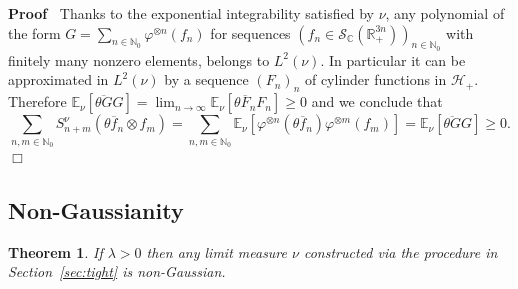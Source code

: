 \documentclass[a4paper,11pt]{article}
\newenvironment{proof}{\noindent\textbf{Proof\ }}{\hspace*{\fill}$\Box$\medskip}
\newtheorem{theorem}{Theorem}[section]
\numberwithin{equation}{section}
\begin{document}
\begin{proof}
  Thanks to the exponential integrability satisfied by $\nu$, any
  polynomial of the form $G = \sum_{n \in\mathbb{N}_{0}} \varphi^{\otimes n} (f_n)$
  for sequences $(f_n \in \mathcal{S}_{\mathbb{C}} (\mathbb{R}^{3 n}_{+}))_{n
  \in\mathbb{N}_{0}}$ with finitely many nonzero elements, belongs to $L^2 (\nu)$.
  In particular it can be approximated in $L^2 (\nu)$ by  a sequence
  $(F_n)_n$ of cylinder functions in $\mathcal{H}_+$. Therefore
  $\mathbb{E}_{\nu}  [\overline{\theta G} G] = \lim_{n \rightarrow \infty}
  \mathbb{E}_{\nu}  [\overline{\theta F_n} F_n] \geqslant 0$ and we conclude
  that
  \[ \sum_{n, m \in\mathbb{N}_{0}} S_{n + m}^{\nu} (\overline{\theta f_n} \otimes
     f_m) = \sum_{n, m \in\mathbb{N}_{0}} \mathbb{E}_{\nu} [\varphi^{\otimes n}
     (\overline{\theta f_n}) \varphi^{\otimes m} (f_m)] =\mathbb{E}_{\nu} 
     [\overline{\theta G} G] \geqslant 0. \]
\end{proof}



\subsection{Non-Gaussianity}
\label{ss:nonG}



\begin{theorem}
 If $\lambda> 0$ then any limit measure $\nu$ constructed via the procedure in Section~\ref{sec:tight} is non-Gaussian.
\end{theorem}
\end{document}
